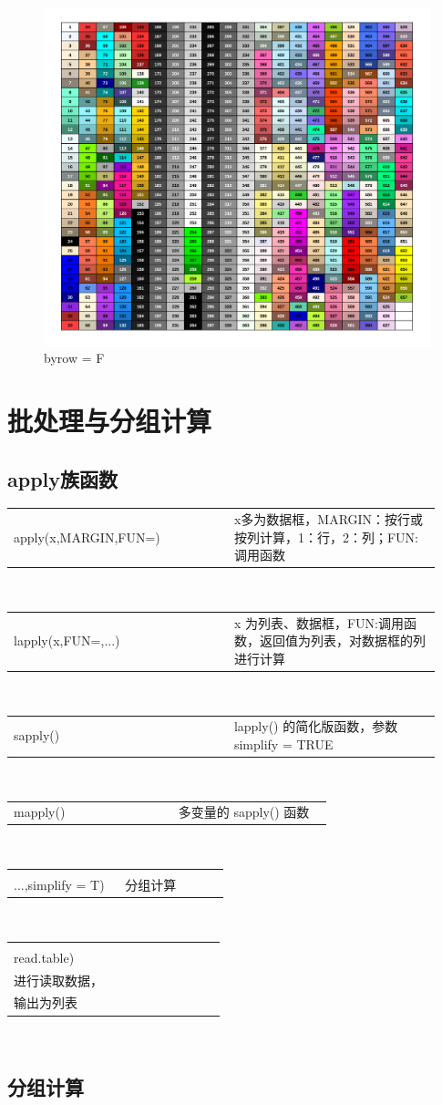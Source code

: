\documentclass[10 pt,landscape]{article}
\newcommand{\rcode}[2]{
   \begin{tabular}{p{0.48\linewidth} p{0.45\linewidth} }
 {\sf \textcolor{a1}{#1} }  &      #2  \\
   \end{tabular}
   \\
}
\begin{document}
\begin{multicols*}{3}
         \begin{figure}[H]
          \centering
       \includegraphics[width =1.1 \linewidth] {showcolor2} 
         \caption{byrow = F}
       \end{figure}
       
        \section{批处理与分组计算}
       \subsection{apply族函数}
          \rcode{apply(x,MARGIN,FUN=)} {x多为数据框，MARGIN：按行或按列计算，1：行，2：列；FUN:调用函数}
         \rcode{lapply(x,FUN=,...)}  {x 为列表、数据框，FUN:调用函数，返回值为列表，对数据框的列进行计算}
         \rcode{sapply()}   {lapply() 的简化版函数，参数 simplify = TRUE}
        \rcode{mapply()}  {多变量的 sapply() 函数}     
        \rcode{\makecell{tapply(x,INDEX,FUN=,\\...,simplify = T)}}  {分组计算} 
        \rcode{\makecell{lapply(file,\\read.table)}} 
        {\makecell{针对多个文件名的向量\\进行读取数据，\\输出为列表}} 
      
      \subsection{分组计算}
      

\end{multicols*}
\end{document}
